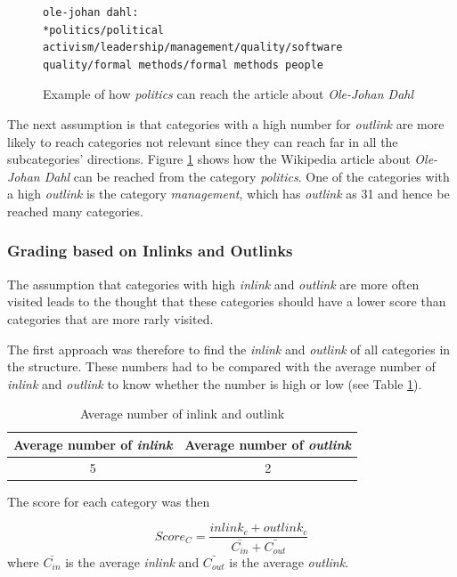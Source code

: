 \begin{figure}[h]
\centering
\begin{lstlisting}
ole-johan dahl:
*politics/political activism/leadership/management/quality/software quality/formal methods/formal methods people
\end{lstlisting}
\caption{Example of how \emph{politics} can reach the article about \emph{Ole-Johan Dahl}}
\label{fig:politicstosoftware}
\end{figure}
The next assumption is that categories with a high number for \emph{outlink} are more likely to reach categories not relevant since they can reach far in all the subcategories' directions. Figure \ref{fig:politicstosoftware} shows how the Wikipedia article about \emph{Ole-Johan Dahl} can be reached from the category \emph{politics}. One of the categories with a high \emph{outlink} is the category \emph{management}, which has \emph{outlink} as 31 and hence be reached many categories. 

\subsubsection{Grading based on Inlinks and Outlinks}
The assumption that categories with high \emph{inlink} and \emph{outlink} are more often visited leads to the thought that these categories should have a lower score than categories that are more rarly visited. 

The first approach was therefore to find the \emph{inlink} and \emph{outlink} of all categories in the structure. These numbers had to be compared with the average number of \emph{inlink} and \emph{outlink} to know whether the number is high or low (see Table \ref{tab:avginlinkoutlink}). 

\begin{table}[h]
\centering
\begin{tabular}{c|c}
\textbf{Average number of \emph{inlink}} & \textbf{Average number of \emph{outlink}}\\ \hline
 5 & 2 \\
\end{tabular}
\caption{Average number of inlink and outlink}
\label{tab:avginlinkoutlink}
\end{table}

The score for each category was then 

\begin{equation} \label{eq:scoreinout}
Score_{C} = \frac{inlink_{c} + outlink_{c}}{\bar{C_{in}} + \bar{C_{out}}}
\end{equation}
where $\bar{C_{in}}$ is the average \emph{inlink} and $\bar{C_{out}}$ is the average \emph{outlink}.

